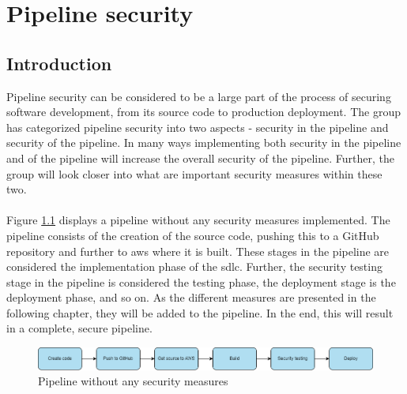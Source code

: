 \chapter{Pipeline security}
\label{Pipeline security}
\section{Introduction}
Pipeline security can be considered to be a large part of the process of securing software development, from its source code to production deployment. The group has categorized pipeline security into two aspects - security in the pipeline and security of the pipeline. In many ways implementing both security in the pipeline and of the pipeline will increase the overall security of the pipeline. Further, the group will look closer into what are important security measures within these two. 
\\~\\
Figure \ref{fig: Pipeline without any security measures} displays a \gls{pipeline} without any security measures implemented. The pipeline consists of the creation of the source code, pushing this to a GitHub repository and further to \acrshort{aws} where it is built. These stages in the pipeline are considered the implementation phase of the \acrshort{sdlc}. Further, the security testing stage in the pipeline is considered the testing phase, the deployment stage is the deployment phase, and so on. As the different measures are presented in the following chapter, they will be added to the pipeline. In the end, this will result in a complete, secure pipeline.

\vspace{2mm}
\begin{figure}[H]
    \centering
    \includegraphics[width=0.8\columnwidth]{Images/SecurePipeline-Page-3.drawio.png}
    \caption{Pipeline without any security measures}
    \label{fig: Pipeline without any security measures}
\end{figure}




